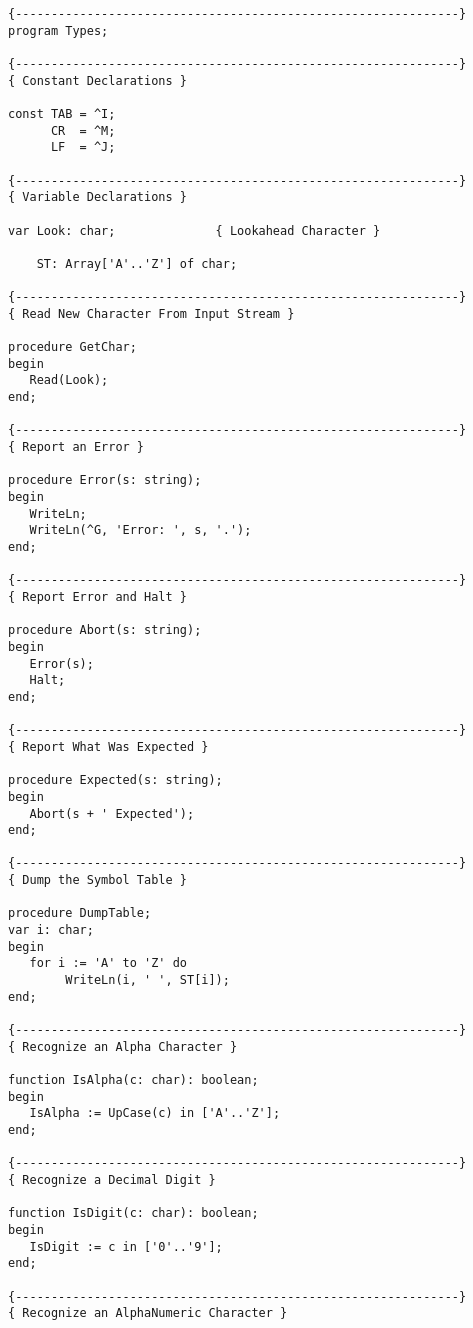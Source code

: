 \begin{verbatim}
{--------------------------------------------------------------}
program Types;

{--------------------------------------------------------------}
{ Constant Declarations }

const TAB = ^I;
      CR  = ^M;
      LF  = ^J;

{--------------------------------------------------------------}
{ Variable Declarations }

var Look: char;              { Lookahead Character }

    ST: Array['A'..'Z'] of char;

{--------------------------------------------------------------}
{ Read New Character From Input Stream }

procedure GetChar;
begin
   Read(Look);
end;

{--------------------------------------------------------------}
{ Report an Error }

procedure Error(s: string);
begin
   WriteLn;
   WriteLn(^G, 'Error: ', s, '.');
end;

{--------------------------------------------------------------}
{ Report Error and Halt }

procedure Abort(s: string);
begin
   Error(s);
   Halt;
end;

{--------------------------------------------------------------}
{ Report What Was Expected }

procedure Expected(s: string);
begin
   Abort(s + ' Expected');
end;

{--------------------------------------------------------------}
{ Dump the Symbol Table }

procedure DumpTable;
var i: char;
begin
   for i := 'A' to 'Z' do
        WriteLn(i, ' ', ST[i]);
end;

{--------------------------------------------------------------}
{ Recognize an Alpha Character }

function IsAlpha(c: char): boolean;
begin
   IsAlpha := UpCase(c) in ['A'..'Z'];
end;

{--------------------------------------------------------------}
{ Recognize a Decimal Digit }

function IsDigit(c: char): boolean;
begin
   IsDigit := c in ['0'..'9'];
end;

{--------------------------------------------------------------}
{ Recognize an AlphaNumeric Character }


\end{verbatim}
